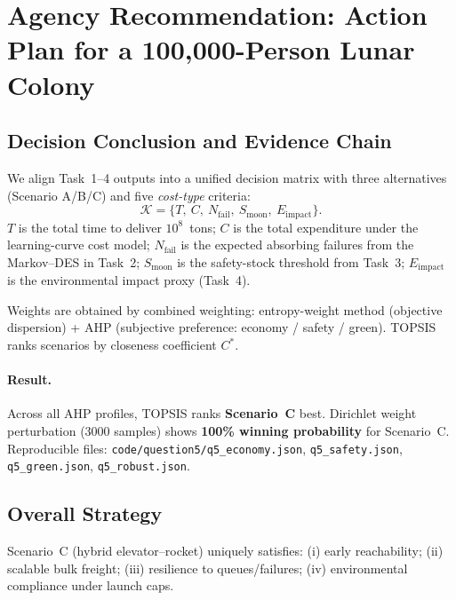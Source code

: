 ﻿\documentclass{mcmthesis}
\begin{document}
\section{Agency Recommendation: Action Plan for a 100{,}000-Person Lunar Colony}
\label{sec:agency_action_plan}

\subsection{Decision Conclusion and Evidence Chain}
\label{subsec:decision_conclusion}

We align Task~1--4 outputs into a unified decision matrix with three alternatives (Scenario A/B/C) and five \emph{cost-type} criteria:
\begin{equation}
\mathcal{K}=\{T,\ C,\ N_{\text{fail}},\ S_{\text{moon}},\ E_{\text{impact}}\}.
\end{equation}
$T$ is the total time to deliver $10^8$~tons; $C$ is the total expenditure under the learning-curve cost model; $N_{\text{fail}}$ is the expected absorbing failures from the Markov--DES in Task~2; $S_{\text{moon}}$ is the safety-stock threshold from Task~3; $E_{\text{impact}}$ is the environmental impact proxy (Task~4).

Weights are obtained by combined weighting: entropy-weight method (objective dispersion) + AHP (subjective preference: economy / safety / green). TOPSIS ranks scenarios by closeness coefficient $C^*$.

\paragraph{Result.} Across all AHP profiles, TOPSIS ranks \textbf{Scenario~C} best. Dirichlet weight perturbation (3000 samples) shows \textbf{100\% winning probability} for Scenario~C. Reproducible files: \texttt{code/question5/q5\_economy.json}, \texttt{q5\_safety.json}, \texttt{q5\_green.json}, \texttt{q5\_robust.json}.

\subsection{Overall Strategy}
\label{subsec:overall_strategy}
Scenario~C (hybrid elevator--rocket) uniquely satisfies: (i) early reachability; (ii) scalable bulk freight; (iii) resilience to queues/failures; (iv) environmental compliance under launch caps.
\end{document}
